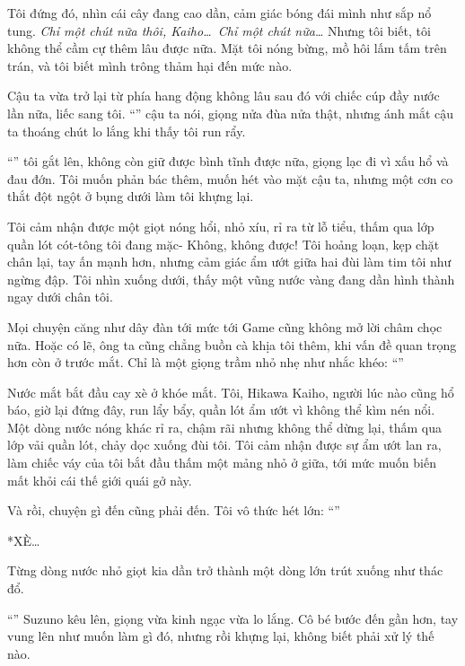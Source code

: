 \documentclass[../main.tex]{subfiles}
\begin{document}
Tôi đứng đó, nhìn cái cây đang cao dần, cảm giác bóng đái mình như sắp nổ tung. \textit{Chỉ một chút nữa thôi, Kaiho\dots\ Chỉ một chút nữa\dots} Nhưng tôi biết, tôi không thể cầm cự thêm lâu được nữa. Mặt tôi nóng bừng, mồ hôi lấm tấm trên trán, và tôi biết mình trông thảm hại đến mức nào.

Cậu ta vừa trở lại từ phía hang động không lâu sau đó với chiếc cúp đầy nước lần nữa, liếc sang tôi. ``'' cậu ta nói, giọng nửa đùa nửa thật, nhưng ánh mắt cậu ta thoáng chút lo lắng khi thấy tôi run rẩy.

``'' tôi gắt lên, không còn giữ được bình tĩnh được nữa, giọng lạc đi vì xấu hổ và đau đớn. Tôi muốn phản bác thêm, muốn hét vào mặt cậu ta, nhưng một cơn co thắt đột ngột ở bụng dưới làm tôi khựng lại.

Tôi cảm nhận được một giọt nóng hổi, nhỏ xíu, rỉ ra từ lỗ tiểu, thấm qua lớp quần lót cót-tông tôi đang mặc- Không, không được! Tôi hoảng loạn, kẹp chặt chân lại, tay ấn mạnh hơn, nhưng cảm giác ẩm ướt giữa hai đùi làm tim tôi như ngừng đập. Tôi nhìn xuống dưới, thấy một vũng nước vàng đang dần hình thành ngay dưới chân tôi.

Mọi chuyện căng như dây đàn tới mức tới Game cũng không mở lời châm chọc nữa. Hoặc có lẽ, ông ta cũng chẳng buồn cà khịa tôi thêm, khi vấn đề quan trọng hơn còn ở trước mắt. Chỉ là một giọng trầm nhỏ nhẹ như nhắc khéo: ``''

Nước mắt bắt đầu cay xè ở khóe mắt. Tôi, Hikawa Kaiho, người lúc nào cũng hổ báo, giờ lại đứng đây, run lẩy bẩy, quần lót ẩm ướt vì không thể kìm nén nổi. Một dòng nước nóng khác rỉ ra, chậm rãi nhưng không thể dừng lại, thấm qua lớp vải quần lót, chảy dọc xuống đùi tôi. Tôi cảm nhận được sự ẩm ướt lan ra, làm chiếc váy của tôi bắt đầu thấm một mảng nhỏ ở giữa, tới mức muốn biến mất khỏi cái thế giới quái gở này.

Và rồi, chuyện gì đến cũng phải đến. Tôi vô thức hét lớn: ``''

*XÈ\dots*

Từng dòng nước nhỏ giọt kia dần trở thành một dòng lớn trút xuống như thác đổ.

``'' Suzuno kêu lên, giọng vừa kinh ngạc vừa lo lắng. Cô bé bước đến gần hơn, tay vung lên như muốn làm gì đó, nhưng rồi khựng lại, không biết phải xử lý thế nào.
\end{document}
